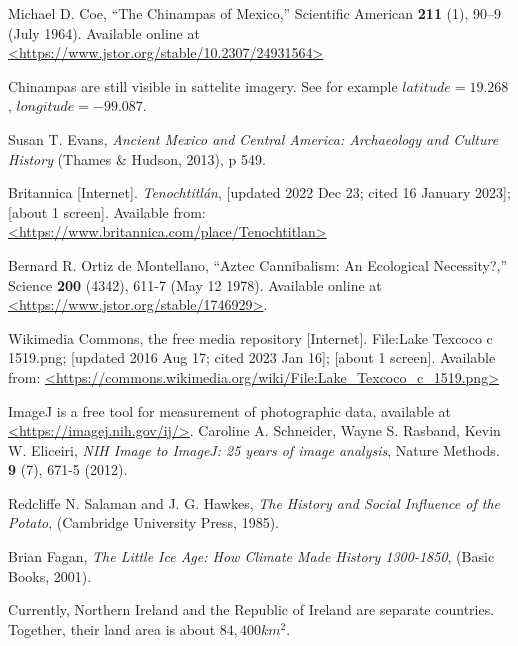 \documentclass[prb,preprint]{revtex4-2}
\begin{document}
\begin{thebibliography}{99}
Michael D. Coe,
``The Chinampas of Mexico,''
Scientific American
\textbf{211} (1), 90--9
(July 1964).
Available online at \url{<https://www.jstor.org/stable/10.2307/24931564>}

Chinampas are still visible in sattelite imagery.  See for example $latitude=19.268$, $longitude=-99.087$.

Susan T. Evans,
\textit{Ancient Mexico and Central America: Archaeology and Culture History}
(Thames \& Hudson, 2013), p 549.

Britannica [Internet].
\textit{Tenochtitlán},
[updated 2022 Dec 23; cited 16 January 2023]; [about 1 screen].
Available from: \url{<https://www.britannica.com/place/Tenochtitlan>}

Bernard R. Ortiz de Montellano,
``Aztec Cannibalism: An Ecological Necessity?,''
Science 
\textbf{200} (4342), 611-7
(May 12 1978).
Available online at \url{<https://www.jstor.org/stable/1746929>}.

Wikimedia Commons, the free media repository [Internet].
File:Lake Texcoco c 1519.png;
[updated 2016 Aug 17; cited 2023 Jan 16]; [about 1 screen].
Available from: \url{<https://commons.wikimedia.org/wiki/File:Lake\_Texcoco\_c\_1519.png>}


ImageJ is a free tool for measurement of photographic data, 
available at \url{<https://imagej.nih.gov/ij/>}.
%
Caroline A. Schneider, Wayne S. Rasband, Kevin W. Eliceiri,
\textit{NIH Image to ImageJ: 25 years of image analysis},
Nature Methods. 
\textbf{9} (7), 671-5 
(2012).

Redcliffe N. Salaman and J. G. Hawkes,
\textit{The History and Social Influence of the Potato},
(Cambridge University Press, 1985).

Brian Fagan,
\textit{The Little Ice Age: How Climate Made History 1300-1850},
(Basic Books, 2001).

Currently, Northern Ireland and the Republic of Ireland are separate countries.  Together, their land area is about $84,400km^2$.


\end{thebibliography}
\end{document}
